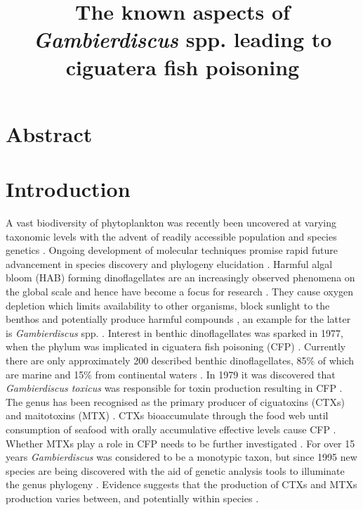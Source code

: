 \documentclass[12pt]{article}
\title{\textbf{The known aspects of \emph{Gambierdiscus} spp. leading to ciguatera fish poisoning}}
\date{}
\begin{document}
\maketitle
\tableofcontents
\section{Abstract}
\section{Introduction}




A vast biodiversity of phytoplankton was recently been uncovered at varying taxonomic levels with the advent of readily accessible population and species genetics \cite{simon2009diversity}. Ongoing development of molecular techniques promise rapid future advancement in species discovery and phylogeny elucidation \cite{murray2012genetic,murray2012transcriptomics}. 
Harmful algal bloom (HAB) forming dinoflagellates are an increasingly observed phenomena on the global scale and hence have become a focus for research \cite{berdalet2012global,hallegraeff2010ocean,garces2012habitat}. They cause oxygen depletion which limits availability to other organisms, block sunlight to the benthos and potentially produce harmful compounds \cite{grandjean2008centers}, an example for the latter is \emph{Gambierdiscus} spp. \cite{lehane2000ciguatera}.
Interest in benthic dinoflagellates was sparked in 1977, when the phylum was implicated in ciguatera fish poisoning (CFP) \cite{yasumoto1977finding}.  
Currently there are only approximately 200 described benthic dinoflagellates, 85\% of which are marine and 15\% from continental waters \cite{gomez2012quantitative}.
In 1979 it was discovered that \emph{Gambierdiscus toxicus} was responsible for toxin production resulting in CFP \cite{adachi1979thecal}. The genus has been recognised as the primary producer of ciguatoxins (CTXs) and maitotoxins (MTX) \cite{chinain1997intraspecific,holmes1998gambierdiscus}. CTXs bioaccumulate through the food web until consumption of seafood with orally accumulative effective levels cause CFP \cite{bagnis1979clinical,gillespie1987possible,sims1987theoretical}. Whether MTXs play a role in CFP needs to be further investigated \cite{kohli2014feeding}. For over 15 years \emph{Gambierdiscus} was considered to be a monotypic taxon, but since 1995 new species are being discovered with the aid of genetic analysis tools to illuminate the genus phylogeny \cite{faust1995observation,holmes1998gambierdiscus,litaker2009taxonomy,chinain1999morphology,fraga2011gambierdiscus,nishimura2014morphology}. Evidence suggests that the production of CTXs and MTXs production varies between, and potentially within species \cite{chinain2010growth,holland2013differences}. \\
\end{document}
